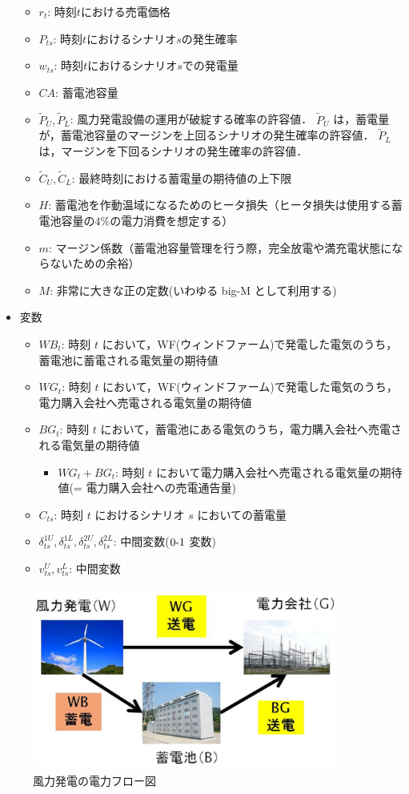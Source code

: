 \documentclass[a4paper,12pt,showkeys]{jreport}
\begin{document}
\begin{itemize}
\begin{itemize}
\item $r_t$: 時刻$t$における売電価格
\item $P_{ts}$: 時刻$t$におけるシナリオ$s$の発生確率
\item $w_{ts}$: 時刻$t$におけるシナリオ$s$での発電量
\item $CA$: 蓄電池容量
\item $\tilde{P}_U, \tilde{P}_L$: 風力発電設備の運用が破綻する確率の許容値．
$\tilde{P}_U$ は，蓄電量が，蓄電池容量のマージンを上回るシナリオの発生確率の許容値．
$\tilde{P}_L$は，マージンを下回るシナリオの発生確率の許容値．
\item $\tilde{C}_U, \tilde{C}_L$: 最終時刻における蓄電量の期待値の上下限
\item $H$: 蓄電池を作動温域になるためのヒータ損失（ヒータ損失は使用する蓄電池容量の$4$\%の電力消費を想定する）
\item $m$: マージン係数（蓄電池容量管理を行う際，完全放電や満充電状態にならないための余裕）
\item $M$: 非常に大きな正の定数(いわゆる big-M として利用する)
\end{itemize}
\item 変数
\begin{itemize}
\item $WB_t$: 時刻 $t$ において，WF(ウィンドファーム)で発電した電気のうち，蓄電池に蓄電される電気量の期待値
\item $WG_t$: 時刻 $t$ において，WF(ウィンドファーム)で発電した電気のうち，電力購入会社へ売電される電気量の期待値
\item $BG_t$: 時刻 $t$ において，蓄電池にある電気のうち，電力購入会社へ売電される電気量の期待値
\begin{itemize}
\item $WG_t + BG_t$: 時刻 $t$ において電力購入会社へ売電される電気量の期待値(= 電力購入会社への売電通告量)
\end{itemize}
\item $C_{ts}$: 時刻 $t$ におけるシナリオ $s$ においての蓄電量
\item $\delta^{1U}_{ts}, \delta^{1L}_{ts}, \delta^{2U}_{ts}, \delta^{2L}_{ts}$: 中間変数($0\mathchar`-1$ 変数)
\item $v^U_{ts}, v^L_{ts}$: 中間変数
\end{itemize}
\end{itemize}

\begin{figure}[h]
\centering
\includegraphics[width=10cm,height=6cm, clip]{WBG.eps}
\caption{風力発電の電力フロー図}
\label{fig:WBG}
\end{figure}
\end{document}

